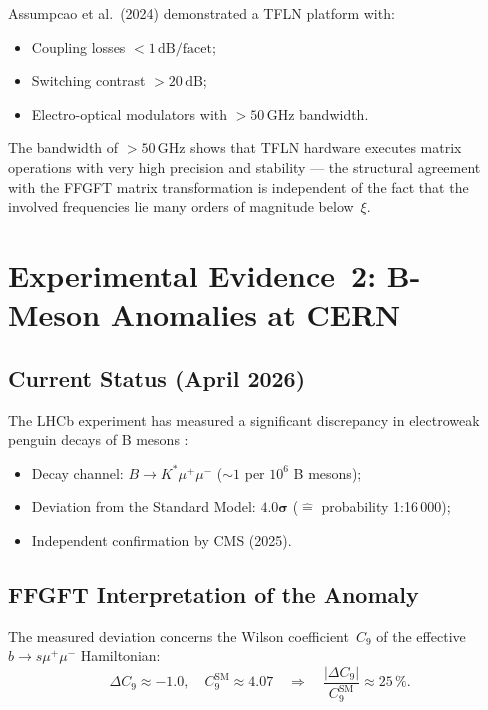 Assumpcao et al.\ (2024) \cite{Assumpcao2024} demonstrated a TFLN
platform with:
\begin{itemize}
  \item Coupling losses $< 1\,\text{dB/facet}$;
  \item Switching contrast $> 20\,\text{dB}$;
  \item Electro-optical modulators with $> 50\,\text{GHz}$ bandwidth.
\end{itemize}
The bandwidth of $>50\,\text{GHz}$ shows that TFLN hardware executes
matrix operations with very high precision and stability — the structural
agreement with the FFGFT matrix transformation is independent of the
fact that the involved frequencies lie many orders of magnitude
below~$\xi$.

\section{Experimental Evidence~2: B-Meson Anomalies at CERN}

\subsection{Current Status (April 2026)}

The LHCb experiment has measured a significant discrepancy in
electroweak penguin decays of B mesons \cite{CERN2026a,CERN2026b}:

\begin{itemize}
  \item Decay channel: $B \to K^*\mu^+\mu^-$ ($\sim 1$ per $10^6$ B mesons);
  \item Deviation from the Standard Model: $\mathbf{4.0\sigma}$
        ($\hat{=}$ probability 1:16\,000);
  \item Independent confirmation by CMS (2025).
\end{itemize}

\subsection{FFGFT Interpretation of the Anomaly}

The measured deviation concerns the Wilson coefficient~$C_9$ of the
effective $b \to s\mu^+\mu^-$ Hamiltonian:
\begin{equation}
  \Delta C_9 \approx -1.0, \quad
  C_9^{\text{SM}} \approx 4.07
  \quad\Rightarrow\quad
  \frac{|\Delta C_9|}{C_9^{\text{SM}}} \approx 25\,\%.
\end{equation}

